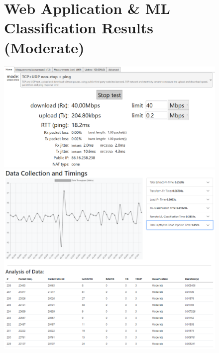 \begin{figure}
\begin{minipage}{\linewidth}
\section{Web Application \& ML Classification Results (Moderate) }
    \centering
    \includegraphics[width=1\linewidth]{images/40mbps.PNG}
    \includegraphics[width=1\linewidth]{images/moderate.PNG}
    \label{appendix:ModerateData}
\end{minipage}
\end{figure}

